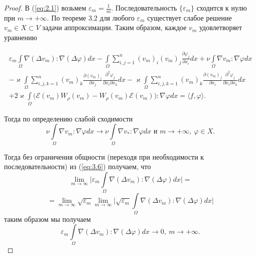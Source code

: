 \begin{proof}
    В (\ref{eq:2.1}) возьмем $\varepsilon_m = \frac{1}{m}$. Последовательность $\{\varepsilon_m\}$ сходится к нулю при $m \rightarrow +\infty$.
    По теореме 3.2 для любого $\varepsilon_m$ существует слабое решение $v_m \in X \subset V$ задачи аппроксимации.
    Таким образом, каждое $v_m$ удовлетворяет уравнению

    \begin{equation}\label{eq:4.1}
        \begin{gathered}
            \varepsilon_m \int\limits_{\Omega} \nabla (\Delta v_m): \nabla (\Delta \varphi) dx -
            \int\limits_{\Omega}\sum_{i,j=1}^n (v_m)_i (v_m)_j \frac{\partial \varphi_j}{\partial x_i} dx + \nu
            \int\limits_{\Omega} \nabla v_m: \nabla \varphi dx\\
            -\varkappa \int\limits_{\Omega}\sum_{i,j,k=1}^n (v_m)_k
            \frac{\partial (v_m)_i}{\partial x_j} \frac{\partial^2 \varphi_j}{\partial x_i \partial x_k} dx - \varkappa \int\limits_{\Omega}\sum_{i,j,k=1}^n
            (v_m)_k \frac{\partial (v_m)_j}{\partial x_i} \frac{\partial^2 \varphi_j}{\partial x_i \partial x_k} dx\\
            +2\varkappa \int\limits_{\Omega} \bigg(\mathcal{E}(v_m)W_\rho (v_m) - W_\rho(v_m)\mathcal{E}(v_m)\bigg): \nabla\varphi dx =
            \langle f, \varphi \rangle.
        \end{gathered}
    \end{equation}

    Тогда по определению слабой сходимости
    $$\nu\int\limits_{\Omega}\nabla v_m: \nabla\varphi dx \rightarrow \nu \int\limits_{\Omega} \nabla v_*: \nabla\varphi dx
    \textrm{ и } m \rightarrow +\infty, \ \varphi \in X.$$

    Тогда без ограничения общности (переходя при необходимости к последовательности) из (\ref{eq:3.6}) получаем, что
    $$\lim_{m \rightarrow \infty}\bigg| \varepsilon_m \int\limits_{\Omega} \nabla (\Delta v_m): \nabla (\Delta \varphi) dx \bigg| =$$
    $$=\lim_{m \rightarrow \infty} \sqrt{\varepsilon_m} \lim_{m \rightarrow \infty}\bigg|\sqrt{\varepsilon_m}
    \int\limits_{\Omega} \nabla (\Delta v_m): \nabla (\Delta \varphi) dx \bigg|$$
    таким образом мы получаем
    $$\varepsilon_m \int\limits_{\Omega} \nabla (\Delta v_m): \nabla (\Delta \varphi) dx \rightarrow 0, \ m \rightarrow +\infty.$$


\end{proof}
